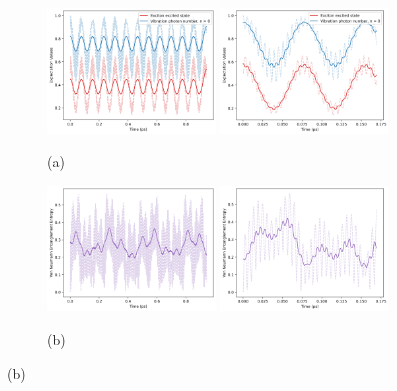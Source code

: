 \documentclass[11pt]{article}
\newcounter{subsubsubsection}[subsubsection]
\begin{document}
\begin{figure}[H]
    \centering

    \begin{subfigure}{\textwidth}
        \centering
        \includegraphics[width=0.49\textwidth]{Research Project/Code/results/ExVib/Closed/Envelope/pops_excited_eg.png}
        \hfill
        \includegraphics[width=0.49\textwidth]{Research Project/Code/results/ExVib/Closed/Fast/pops_excited_eg.png}
        \caption{(a)}
        \label{fig:EVM_CQS_Pop_eg}
    \end{subfigure}

    \vspace{0.8em}

    \begin{subfigure}{\textwidth}
        \centering
        \includegraphics[width=0.49\textwidth]{Research Project/Code/results/ExVib/Closed/Envelope/vne_eg.png}
        \hfill
        \includegraphics[width=0.49\textwidth]{Research Project/Code/results/ExVib/Closed/Fast/vne_eg.png}
        \caption{(b)}
        \label{fig:EVM_CQS_ent_e0}
    \end{subfigure}


\end{figure}
\end{document}
